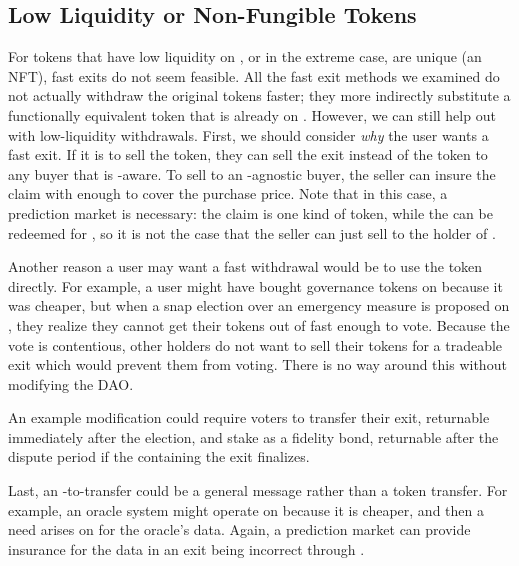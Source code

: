 \subsection{Low Liquidity or Non-Fungible Tokens}
\label{sec:nfts}

For tokens that have low liquidity on \layerone, or in the extreme case, are unique (\eg an NFT), fast exits do not seem feasible. All the fast exit methods we examined do not actually withdraw the original tokens faster; they more indirectly substitute a functionally equivalent token that is already on \layerone. However, we can still help out with low-liquidity withdrawals. First, we should consider \textit{why} the user wants a fast exit. If it is to sell the token, they can sell the exit instead of the token to any buyer that is \layertwo-aware. To sell to an \layertwo-agnostic buyer, the seller can insure the claim with enough \fail to cover the purchase price. Note that in this case, a prediction market is necessary: the claim is one kind of token, while the \fail can be redeemed for \ethone, so it is not the case that the seller can just sell to the holder of \final.

Another reason a user may want a fast withdrawal would be to use the token directly. For example, a user might have bought governance tokens on \layertwo because it was cheaper, but when a snap election over an emergency measure is proposed on \layerone, they realize they cannot get their tokens out of \layertwo fast enough to vote. Because the vote is contentious, other holders do not want to sell their tokens for a tradeable exit which would prevent them from voting. There is no way around this without modifying the DAO.

An example modification could require voters to transfer their exit, returnable immediately after the election, and stake \ethone as a fidelity bond, returnable after the dispute period if the \rblock containing the exit finalizes.


Last, an \layertwo-to-\layerone transfer could be a general message rather than a token transfer. For example, an oracle system might operate on \layertwo because it is cheaper, and then a need arises on \layerone for the oracle's data. Again, a prediction market can provide insurance for the data in an exit being incorrect through \fail.


